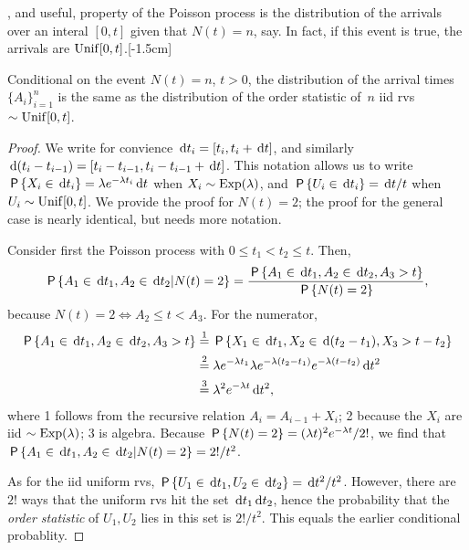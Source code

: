 \documentclass[stochastic-or.tex]{subfiles}
\begin{document}
, and useful, property of the Poisson process is the distribution of the arrivals over an interal $[0,t]$ given that $N(t) = n$, say.
In fact, if this event is true, the arrivals are $\Unif{[0,t]}$.[-1.5cm]
\begin{theorem}\label{thr:1}
Conditional on the event $N(t)=n$, $t>0$, the distribution of the arrival times $\{A_{i}\}_{i=1}^{n}$ is the same as the distribution of the order statistic of~$n$ iid rvs $\sim \Unif{[0,t]}$.
\end{theorem}
\begin{proof}
We write for convience $\d t_i = [t_{i}, t_i + \d t]$, and similarly $\d(t_i-t_{i-1}) = [t_i-t_{i-1}, t_i-t_{i-1}+\d t]$. This notation allows us to write $\P{X_i \in \d t_i} = \lambda e^{-\lambda t_i} \d t$ when $X_i\sim \Exp{\lambda}$, and $\P{U_i\in \d t_i } = \d t /t$ when $U_i\sim \Unif{[0,t]}$.
We provide the proof for $N(t)=2$; the proof for the general case is nearly identical, but needs more notation.

Consider first the Poisson process with $0\leq t_1<t_2 \leq  t$. Then,
\begin{align*}
  \P{A_1\in \d t_1, A_2\in \d t_2 | N(t)=2}
= \frac{\P{A_1\in \d t_1, A_2\in \d t_2, A_3 > t}}{\P{N(t)=2}},
\end{align*}
because $N(t) = 2 \iff A_{2} \leq t < A_{3}$.
For the numerator,
\begin{align*}
\P{A_1\in \d t_1, A_2\in \d t_2, A_3 > t}
  &\stackrel1= \P{X_1\in \d t_1, X_2\in \d (t_2-t_1), X_3 > t-t_{2}} \\
  &\stackrel2= \lambda e^{-\lambda t_1} \lambda e^{-\lambda (t_2-t_1)} e^{-\lambda (t-t_2)} \d t^{2}  \\
  &\stackrel3= \lambda^{2} e^{-\lambda t} \d  t^{2},
\end{align*}
where  1 follows from the recursive relation  $A_{i} = A_{i-1} + X_{i}$; 2 because the $X_i$ are iid  $\sim \Exp{\lambda}$; 3 is algebra.
Because $\P{N(t)=2} = (\lambda t)^2 e^{-\lambda t}/2!$, we find that
$ \P{A_1\in \d t_1, A_2\in \d t_2 | N(t)=2} =  2!/t^{2}$.

As for the iid uniform rvs, $\P{U_1\in \d t_1, U_2\in \d t_2} = \d t^2/ t^{2}$.
However, there are $2!$ ways that the uniform rvs hit the set $\d t_1 \d t_{2}$, hence the probability that the \emph{order statistic} of $U_{1}, U_2$ lies in this set is $2!/t^{2}$.
This equals the earlier conditional probablity.
\end{proof}
\end{document}
